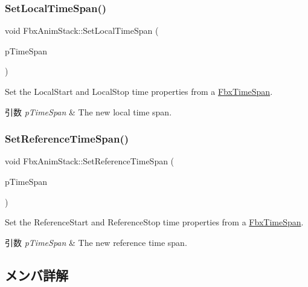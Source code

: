 \subsubsection{\texorpdfstring{Set\+Local\+Time\+Span()}{SetLocalTimeSpan()}}
{\footnotesize\ttfamily void Fbx\+Anim\+Stack\+::\+Set\+Local\+Time\+Span (\begin{DoxyParamCaption}\item[{\hyperlink{class_fbx_time_span}{Fbx\+Time\+Span} \&}]{p\+Time\+Span }\end{DoxyParamCaption})}

Set the Local\+Start and Local\+Stop time properties from a \hyperlink{class_fbx_time_span}{Fbx\+Time\+Span}. 
\begin{DoxyParams}{引数}
{\em p\+Time\+Span} & The new local time span. \\
\hline
\end{DoxyParams}
\mbox{\label{class_fbx_anim_stack_ae63b01339e65e5a6c52ce532e0006e8b}} 
\subsubsection{\texorpdfstring{Set\+Reference\+Time\+Span()}{SetReferenceTimeSpan()}}
{\footnotesize\ttfamily void Fbx\+Anim\+Stack\+::\+Set\+Reference\+Time\+Span (\begin{DoxyParamCaption}\item[{\hyperlink{class_fbx_time_span}{Fbx\+Time\+Span} \&}]{p\+Time\+Span }\end{DoxyParamCaption})}

Set the Reference\+Start and Reference\+Stop time properties from a \hyperlink{class_fbx_time_span}{Fbx\+Time\+Span}. 
\begin{DoxyParams}{引数}
{\em p\+Time\+Span} & The new reference time span. \\
\hline
\end{DoxyParams}


\subsection{メンバ詳解}
\mbox{\label{class_fbx_anim_stack_a87abfeabeaa31a44e2474f01d4501b7f}} 
